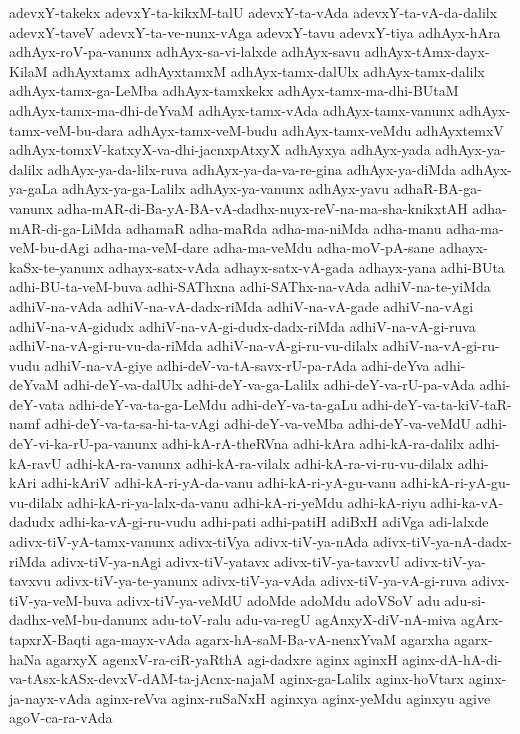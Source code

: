 {adevxY-takekx
adevxY-ta-kikxM-talU
adevxY-ta-vAda
adevxY-ta-vA-da-dalilx
adevxY-taveV
adevxY-ta-ve-nunx-vAga
adevxY-tavu
adevxY-tiya
adhAyx-hAra
adhAyx-roV-pa-vanunx
adhAyx-sa-vi-lalxde
adhAyx-savu
adhAyx-tAmx-dayx-KilaM
adhAyxtamx
adhAyxtamxM
adhAyx-tamx-dalUlx
adhAyx-tamx-dalilx
adhAyx-tamx-ga-LeMba
adhAyx-tamxkekx
adhAyx-tamx-ma-dhi-BUtaM
adhAyx-tamx-ma-dhi-deYvaM
adhAyx-tamx-vAda
adhAyx-tamx-vanunx
adhAyx-tamx-veM-bu-dara
adhAyx-tamx-veM-budu
adhAyx-tamx-veMdu
adhAyxtemxV
adhAyx-tomxV-katxyX-va-dhi-jacnxpAtxyX
adhAyxya
adhAyx-yada
adhAyx-ya-dalilx
adhAyx-ya-da-lilx-ruva
adhAyx-ya-da-va-re-gina
adhAyx-ya-diMda
adhAyx-ya-gaLa
adhAyx-ya-ga-Lalilx
adhAyx-ya-vanunx
adhAyx-yavu
adhaR-BA-ga-vanunx
adha-mAR-di-Ba-yA-BA-vA-dadhx-nuyx-reV-na-ma-sha-knikxtAH
adha-mAR-di-ga-LiMda
adhamaR
adha-maRda
adha-ma-niMda
adha-manu
adha-ma-veM-bu-dAgi
adha-ma-veM-dare
adha-ma-veMdu
adha-moV-pA-sane
adhayx-kaSx-te-yanunx
adhayx-satx-vAda
adhayx-satx-vA-gada
adhayx-yana
adhi-BUta
adhi-BU-ta-veM-buva
adhi-SAThxna
adhi-SAThx-na-vAda
adhiV-na-te-yiMda
adhiV-na-vAda
adhiV-na-vA-dadx-riMda
adhiV-na-vA-gade
adhiV-na-vAgi
adhiV-na-vA-gidudx
adhiV-na-vA-gi-dudx-dadx-riMda
adhiV-na-vA-gi-ruva
adhiV-na-vA-gi-ru-vu-da-riMda
adhiV-na-vA-gi-ru-vu-dilalx
adhiV-na-vA-gi-ru-vudu
adhiV-na-vA-giye
adhi-deV-va-tA-savx-rU-pa-rAda
adhi-deYva
adhi-deYvaM
adhi-deY-va-dalUlx
adhi-deY-va-ga-Lalilx
adhi-deY-va-rU-pa-vAda
adhi-deY-vata
adhi-deY-va-ta-ga-LeMdu
adhi-deY-va-ta-gaLu
adhi-deY-va-ta-kiV-taR-namf
adhi-deY-va-ta-sa-hi-ta-vAgi
adhi-deY-va-veMba
adhi-deY-va-veMdU
adhi-deY-vi-ka-rU-pa-vanunx
adhi-kA-rA-theRVna
adhi-kAra
adhi-kA-ra-dalilx
adhi-kA-ravU
adhi-kA-ra-vanunx
adhi-kA-ra-vilalx
adhi-kA-ra-vi-ru-vu-dilalx
adhi-kAri
adhi-kAriV
adhi-kA-ri-yA-da-vanu
adhi-kA-ri-yA-gu-vanu
adhi-kA-ri-yA-gu-vu-dilalx
adhi-kA-ri-ya-lalx-da-vanu
adhi-kA-ri-yeMdu
adhi-kA-riyu
adhi-ka-vA-dadudx
adhi-ka-vA-gi-ru-vudu
adhi-pati
adhi-patiH
adiBxH
adiVga
adi-lalxde
adivx-tiV-yA-tamx-vanunx
adivx-tiVya
adivx-tiV-ya-nAda
adivx-tiV-ya-nA-dadx-riMda
adivx-tiV-ya-nAgi
adivx-tiV-yatavx
adivx-tiV-ya-tavxvU
adivx-tiV-ya-tavxvu
adivx-tiV-ya-te-yanunx
adivx-tiV-ya-vAda
adivx-tiV-ya-vA-gi-ruva
adivx-tiV-ya-veM-buva
adivx-tiV-ya-veMdU
adoMde
adoMdu
adoVSoV
adu
adu-si-dadhx-veM-bu-danunx
adu-toV-ralu
adu-va-regU
agAnxyX-diV-nA-miva
agArx-tapxrX-Baqti
aga-mayx-vAda
agarx-hA-saM-Ba-vA-nenxYvaM
agarxha
agarx-haNa
agarxyX
agenxV-ra-ciR-yaRthA
agi-dadxre
aginx
aginxH
aginx-dA-hA-di-va-tAsx-kASx-devxV-dAM-ta-jAcnx-najaM
aginx-ga-Lalilx
aginx-hoVtarx
aginx-ja-nayx-vAda
aginx-reVva
aginx-ruSaNxH
aginxya
aginx-yeMdu
aginxyu
agive
agoV-ca-ra-vAda
}
